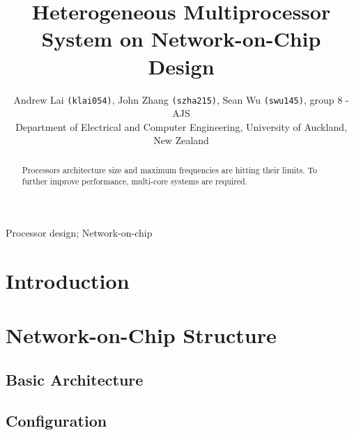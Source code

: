 \documentclass[journal, onecolumn]{IEEEtran}
\begin{document}
	
\begin{titlepage}
	
\end{titlepage}

	\setcounter{page}{2}
	
	\title{Heterogeneous Multiprocessor System on Network-on-Chip Design}
	\author{Andrew Lai \texttt{(klai054)}, John Zhang \texttt{(szha215)}, Sean Wu \texttt{(swu145)}, group 8 - AJS \\Department of Electrical and Computer Engineering, University of Auckland, New Zealand}
	
	\maketitle
	
	\begin{abstract}
		Processors architecture size and maximum frequencies are hitting their limits. To further improve performance, multi-core systems are required.
	\end{abstract}
	
	\begin{IEEEkeywords}
		Processor design; Network-on-chip 
	\end{IEEEkeywords}
	
	
	\section{Introduction}
	
	
	
	\section{Network-on-Chip Structure}
	
		\subsection{Basic Architecture}
		
		\subsection{Configuration}
	
\end{document}
